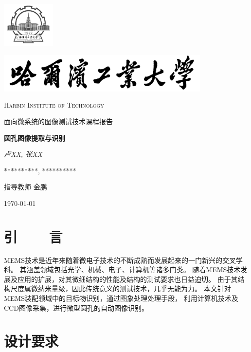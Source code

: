 \documentclass[12pt,a4paper]{article}
\begin{document}
\begin{titlepage}
    \centering
    \includegraphics[width=0.2\textwidth]{sf1.png}\par
    \vspace{1cm}
    \includegraphics[width=0.8\textwidth]{sf.jpg}\par
    \vspace{0.1cm}
    {\scshape\LARGE Harbin Institute of Technology \par}
    \vspace{1cm}
    {\kaishu\LARGE 面向微系统的图像测试技术课程报告\par}
    \vspace{1.5cm}
    {\huge\bfseries 圆孔图像提取与识别\par}
    \vspace{2cm}
    {\fangsong\Large\itshape 卢XX, 张XX\par}
    \vfill
    {**********, **********}\par

    \vfill
    指导教师	\textsc{金鹏}
    \vfill
    {\large \today\par}
\end{titlepage}

\section{引~~~~言}

MEMS技术是近年来随着微电子技术的不断成熟而发展起来的一门新兴的交叉学科。 
其涵盖领域包括光学、机械、电子、计算机等诸多门类。 
随着MEMS技术发展及应用的扩展，对其微细结构的性能及结构的测试要求也日益迫切。 
由于其结构尺度属微纳米量级，因此传统意义的测试技术，几乎无能为力。 
本文针对MEMS装配领域中的目标物识别，通过图象处理处理手段，
利用计算机技术及CCD图像采集，进行微型圆孔的自动图像识别。

\section{设计要求}
\end{document}
